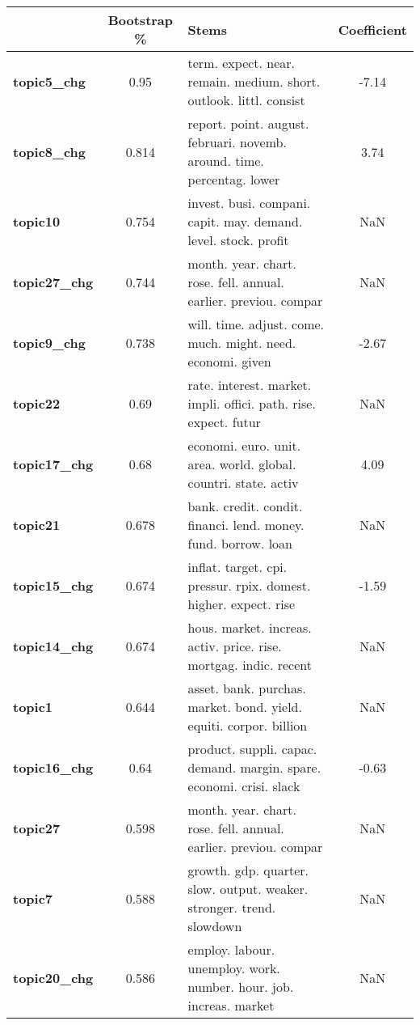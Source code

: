 \begin{tabular}{|l|c|l|c|}
\toprule
{} & Bootstrap \% &                                                                    Stems &  Coefficient \\
\midrule
\textbf{topic5\_chg } &  0.95 &  term. expect. near. remain. medium. short. outlook. littl. consist & -7.14 \\
\textbf{topic8\_chg } &  0.814 &  report. point. august. februari. novemb. around. time. percentag. lower &  3.74 \\
\textbf{topic10    } &  0.754 &  invest. busi. compani. capit. may. demand. level. stock. profit & NaN \\
\textbf{topic27\_chg} &  0.744 &  month. year. chart. rose. fell. annual. earlier. previou. compar & NaN \\
\textbf{topic9\_chg } &  0.738 &  will. time. adjust. come. much. might. need. economi. given & -2.67 \\
\textbf{topic22    } &  0.69 &  rate. interest. market. impli. offici. path. rise. expect. futur & NaN \\
\textbf{topic17\_chg} &  0.68 &  economi. euro. unit. area. world. global. countri. state. activ &  4.09 \\
\textbf{topic21    } &  0.678 &  bank. credit. condit. financi. lend. money. fund. borrow. loan & NaN \\
\textbf{topic15\_chg} &  0.674 &  inflat. target. cpi. pressur. rpix. domest. higher. expect. rise & -1.59 \\
\textbf{topic14\_chg} &  0.674 &  hous. market. increas. activ. price. rise. mortgag. indic. recent & NaN \\
\textbf{topic1     } &  0.644 &  asset. bank. purchas. market. bond. yield. equiti. corpor. billion & NaN \\
\textbf{topic16\_chg} &  0.64 &  product. suppli. capac. demand. margin. spare. economi. crisi. slack & -0.63 \\
\textbf{topic27    } &  0.598 &  month. year. chart. rose. fell. annual. earlier. previou. compar & NaN \\
\textbf{topic7     } &  0.588 &  growth. gdp. quarter. slow. output. weaker. stronger. trend. slowdown & NaN \\
\textbf{topic20\_chg} &  0.586 &  employ. labour. unemploy. work. number. hour. job. increas. market & NaN \\
\bottomrule
\end{tabular}
